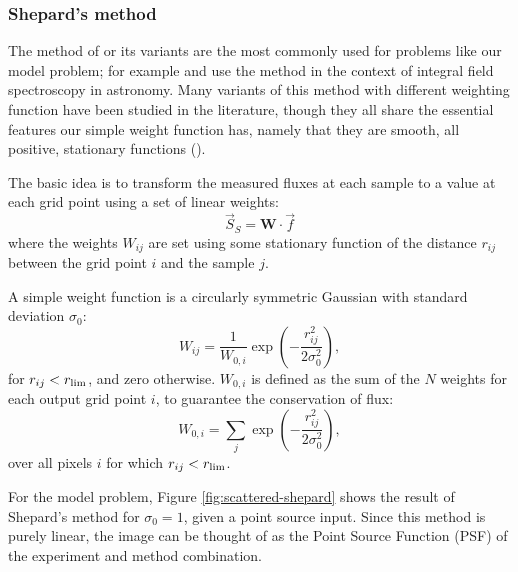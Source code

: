 \documentclass[twocolumn,tighten]{aastex61}
\begin{document}
\subsubsection{Shepard's method}
\label{subsec:shepard}

The method of \citet{shepard68a} or its variants are the most commonly
used for problems like our model problem; for example
\citet{sanchez12a} and \citet{law16a} use the method in the context of
integral field spectroscopy in astronomy. Many variants of this method
with different weighting function have been studied in the literature,
though they all share the essential features our simple weight
function has, namely that they are smooth, all positive, stationary
functions (\citealt{dellaccio16a}).

The basic idea is to transform the measured fluxes at each sample to
a value at each grid point using a set of linear weights:
\begin{equation}
\vec{S}_S = \mathbf{W}\cdot \vec{f}
\end{equation}
where the weights $W_{ij}$ are set using some stationary function of
the distance $r_{ij}$ between the grid point $i$ and the sample $j$.

A simple weight function is a circularly symmetric Gaussian with
standard deviation $\sigma_0$:
\begin{equation}
\label{eq:shepard_weights}
  W_{ij} = 
  \frac{1}{W_{0,i}}\exp\left(-\frac{r_{ij}^2}{2\sigma_0^2}\right),
\end{equation}
for $r_{ij} < r_{\rm lim}$, and zero otherwise. 
$W_{0, i}$ is
defined as the sum of the $N$ weights for each output grid point $i$,
to guarantee the conservation of flux:
\begin{equation}
\label{eq:shepard_norm}
W_{0, i} =\sum_{j}\exp\left(-\frac{r_{ij}^2}{2 \sigma_0^2}\right),
\end{equation}
over all pixels $i$ for which $r_{ij}< r_{\rm lim}$. 

For the model problem, Figure \ref{fig:scattered-shepard} shows the
result of Shepard's method for $\sigma_0 = 1$, given a point source
input. Since this method is purely linear, the image can be thought of
as the Point Source Function (PSF) of the experiment and method
combination.
\end{document}
